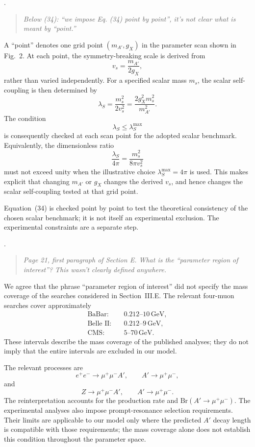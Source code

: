 \documentclass[12pt,a4paper]{article}
\begin{document}
\medskip
{}. \begin{quote}\itshape
Below (34): ``we impose Eq. (34) point by point'', it's not clear what is meant by ``point.''
\end{quote}

A ``point'' denotes one grid point \((m_{A'},g_X)\) in the parameter scan shown in Fig.~2. At each point, the symmetry-breaking scale is derived from
\[
v_s=\frac{m_{A'}}{2g_X},
\]
rather than varied independently. For a specified scalar mass \(m_s\), the scalar self-coupling is then determined by
\[
\lambda_S
=\frac{m_s^2}{2v_s^2}
=\frac{2g_X^2m_s^2}{m_{A'}^2}.
\]
The condition
\[
\lambda_S\leq\lambda_S^{\max}
\]
is consequently checked at each scan point for the adopted scalar benchmark. Equivalently, the dimensionless ratio
\[
\frac{\lambda_S}{4\pi}
=\frac{m_s^2}{8\pi v_s^2}
\]
must not exceed unity when the illustrative choice \(\lambda_S^{\max}=4\pi\) is used. This makes explicit that changing \(m_{A'}\) or \(g_X\) changes the derived \(v_s\), and hence changes the scalar self-coupling tested at that grid point.

Equation~(34) is checked point by point to test the theoretical consistency of the chosen scalar benchmark; it is not itself an experimental exclusion. The experimental constraints are a separate step.

\medskip
{}. \begin{quote}\itshape
Page 21, first paragraph of Section E. What is the ``parameter region of interest''? This wasn't clearly defined anywhere.
\end{quote}

We agree that the phrase ``parameter region of interest'' did not specify the mass coverage of the searches considered in Section~III.E. The relevant four-muon searches cover approximately
\[
\begin{aligned}
\text{BaBar}:&\quad 0.212\text{--}10\,\mathrm{GeV},\\
\text{Belle II}:&\quad 0.212\text{--}9\,\mathrm{GeV},\\
\text{CMS}:&\quad 5\text{--}70\,\mathrm{GeV}.
\end{aligned}
\]
These intervals describe the mass coverage of the published analyses; they do not imply that the entire intervals are excluded in our model.

The relevant processes are
\[
e^+e^-\to\mu^+\mu^-A',
\qquad A'\to\mu^+\mu^-,
\]
and
\[
Z\to\mu^+\mu^-A',
\qquad A'\to\mu^+\mu^-.
\]
The reinterpretation accounts for the production rate and \(\mathrm{Br}(A'\to\mu^+\mu^-)\). The experimental analyses also impose prompt-resonance selection requirements. Their limits are applicable to our model only where the predicted \(A'\) decay length is compatible with those requirements; the mass coverage alone does not establish this condition throughout the parameter space.
\end{document}
